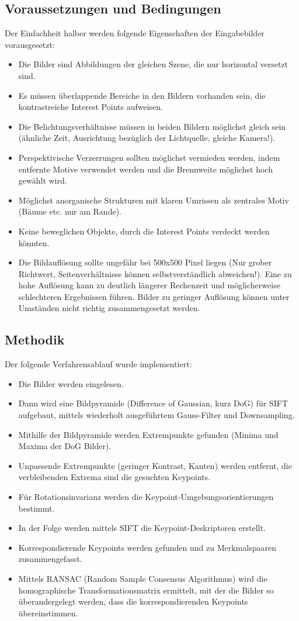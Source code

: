 \documentclass[deutsch]{scrartcl}
\begin{document}
\subsection{Voraussetzungen und Bedingungen}
Der Einfachheit halber werden folgende Eigenschaften der Eingabebilder vorausgesetzt:
\begin{itemize}
	\item Die Bilder sind Abbildungen der gleichen Szene, die nur horizontal versetzt sind.
	\item Es müssen überlappende Bereiche in den Bildern vorhanden sein, die kontrastreiche Interest Points aufweisen.
	\item Die Belichtungsverhältnisse müssen in beiden Bildern möglichst gleich sein (ähnliche Zeit, Ausrichtung bezüglich der Lichtquelle, gleiche Kamera!).
	\item Perspektivische Verzerrungen sollten möglichst vermieden werden, indem entfernte Motive verwendet werden und die Brennweite möglichst hoch gewählt wird.
	\item Möglichst anorganische Strukturen mit klaren Umrissen als zentrales Motiv (Bäume etc. nur am Rande).
	\item Keine beweglichen Objekte, durch die Interest Points verdeckt werden könnten.
	\item Die Bildauflösung sollte ungefähr bei 500x500 Pixel liegen (Nur grober Richtwert, Seitenverhältnisse können selbstverständlich abweichen!). Eine zu hohe Auflösung kann zu deutlich längerer Rechenzeit und möglicherweise schlechteren Ergebnissen führen. Bilder zu geringer Auflösung können unter Umständen nicht richtig zusammengesetzt werden.
\end{itemize}

\subsection{Methodik}
Der folgende Verfahrensablauf wurde implementiert:
\begin{itemize}
	\item Die Bilder werden eingelesen.
	\item Dann wird eine Bildpyramide (Difference of Gaussian, kurz DoG) für SIFT aufgebaut, mittels wiederholt ausgeführtem Gauss-Filter und Downsampling.
	\item Mithilfe der Bildpyramide werden Extrempunkte gefunden (Minima und Maxima der DoG Bilder).
	\item Unpassende Extrempunkte (geringer Kontrast, Kanten) werden entfernt, die verbleibenden Extrema sind die gesuchten Keypoints.
	\item Für Rotationsinvarianz werden die Keypoint-Umgebungsorientierungen bestimmt.
	\item In der Folge werden mittels SIFT die Keypoint-Deskriptoren erstellt.
	\item Korrespondierende Keypoints werden gefunden und zu Merkmalspaaren zusammengefasst.
	\item Mittels RANSAC (Random Sample Consensus Algorithmus) wird die homographische Transformationsmatrix ermittelt, mit der die Bilder so überandergelegt werden, dass die korrespondierenden Keypoints übereinstimmen.
\end{itemize}
\end{document}

